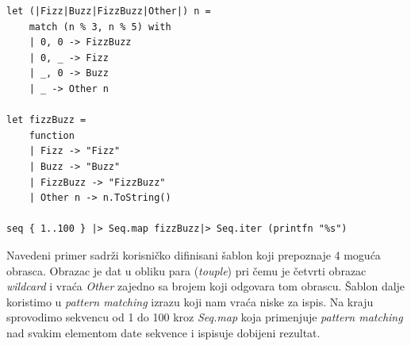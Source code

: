 \documentclass[a4paper]{article}
\begin{document}
\begin{lstlisting}[caption={Fizz Buzz\cite{fizzBuzz}},frame=single, label=primer]
let (|Fizz|Buzz|FizzBuzz|Other|) n =
    match (n % 3, n % 5) with
    | 0, 0 -> FizzBuzz
    | 0, _ -> Fizz
    | _, 0 -> Buzz
    | _ -> Other n

let fizzBuzz =
    function
    | Fizz -> "Fizz"
    | Buzz -> "Buzz"
    | FizzBuzz -> "FizzBuzz"
    | Other n -> n.ToString()

seq { 1..100 } |> Seq.map fizzBuzz|> Seq.iter (printfn "%s")
\end{lstlisting}

Navedeni primer sadrži korisničko difinisani šablon koji prepoznaje 4 moguća obrasca. Obrazac je dat u obliku para (\textit{touple}) pri čemu je četvrti obrazac \textit{wildcard} i vraća \textit{Other} zajedno sa brojem koji odgovara tom obrascu. Šablon dalje koristimo u \textit{pattern matching} izrazu koji nam vraća niske za ispis. Na kraju sprovodimo sekvencu od 1 do 100 kroz \textit{Seq.map} koja primenjuje \textit{pattern matching} nad svakim elementom date sekvence i ispisuje dobijeni rezultat.
\end{document}
